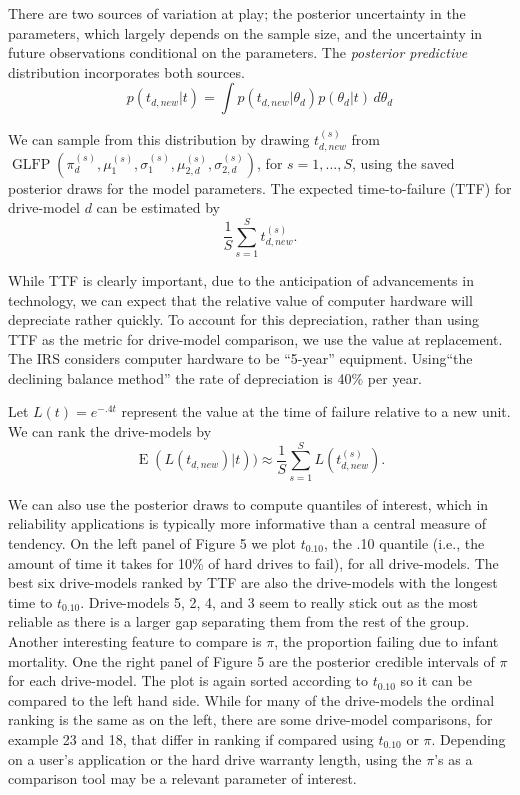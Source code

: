 \documentclass[12pt]{article}
\newcommand{\op}{\operatorname}
\begin{document}
There are two sources of variation at play; the
posterior uncertainty in the parameters, which largely depends on the
sample size, and the uncertainty in future
observations conditional on the parameters. The {\em posterior
  predictive} distribution incorporates both sources.
\begin{equation*}
  p(t_{d,new}|t) = \int p(t_{d,new}|\theta_d) p(\theta_d|t) \, d\theta_d
\end{equation*}

We can sample from this distribution by drawing $t_{d,new}^{(s)}$ from
$\operatorname{GLFP}(\pi_d^{(s)},
\mu_1^{(s)},\sigma_1^{(s)},\mu_{2,d}^{(s)},\sigma_{2,d}^{(s)})$, for
$s=1,...,S$, using the saved posterior draws for the model
parameters. The expected time-to-failure (TTF) for drive-model $d$ can be estimated by
$$\frac{1}{S} \sum_{s=1}^{S} t_{d,new}^{(s)}.$$

While TTF is clearly important, due to the
anticipation of advancements in technology, we can expect that the
relative value of computer hardware will depreciate rather quickly. To account
for this depreciation, rather than using TTF as the metric for drive-model comparison, we use the value at replacement. The IRS considers
computer hardware to be ``5-year'' equipment\cite{f4562}. Using``the declining
balance method'' the rate of depreciation is 40\% per year.

Let $L(t) = e^{-.4t}$ represent the value at the time of failure
relative to a new unit. We can rank the drive-models by 
$$\op{E}(L(t_{d,new})|t))\approx \frac{1}{S} \sum_{s=1}^{S} L(t_{d,new}^{(s)}).$$


We can also use the posterior draws to compute quantiles of interest, which in reliability applications is typically more informative than a central measure of tendency.  On the left panel of Figure 5 we plot $t_{0.10}$, the .10 quantile (i.e., the amount of time it takes for 10\% of hard drives to fail), for all drive-models. The best six drive-models ranked by TTF are also the drive-models with the longest time to $t_{0.10}$.  Drive-models 5, 2, 4, and 3 seem to really stick out as the most reliable as there is a larger gap separating them from the rest of the group.  Another interesting feature to compare is $\pi$, the proportion failing due to infant mortality.  One the right panel of Figure 5 are the posterior credible intervals of $\pi$ for each drive-model.  The plot is again sorted according to $t_{0.10}$ so it can be compared to the left hand side.  While for many of the drive-models the ordinal ranking is the same as on the left, there are some drive-model comparisons, for example 23 and 18, that differ in ranking if compared using $t_{0.10}$ or $\pi$.  Depending on a user's application or the hard drive warranty length, using the $\pi$'s as a comparison tool may be a relevant parameter of interest.   
 
\end{document}
